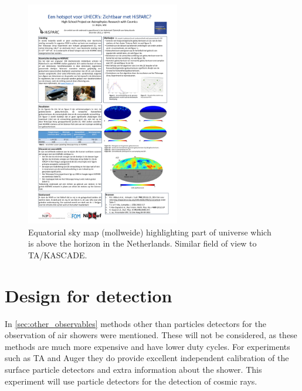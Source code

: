\begin{figure}
    \centering
    \includegraphics[width=0.6\textwidth]
                    {plots/cosmic-rays/visible_sky_map}
    \caption{Equatorial sky map (mollweide) highlighting part of universe which is above the horizon in the Netherlands. Similar field of view to TA/KASCADE.}
    \label{fig:visible_sky_map}
\end{figure}


\section{Design for detection}

In \cref{sec:other_observables} methods other than particles detectors for the observation of air showers were mentioned. These will not be considered, as these methods are much more expensive and have lower duty cycles. For experiments such as TA and Auger they do provide excellent independent calibration of the surface particle detectors and extra information about the shower. This experiment will use particle detectors for the detection of cosmic rays.

